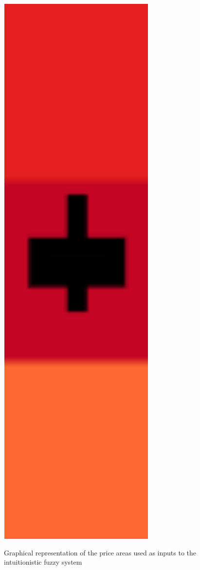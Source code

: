\begin{figure}
\caption{Graphical representation of the price areas used as inputs to the
  intuitionistic fuzzy system} \centering
\includegraphics[width=0.7\textwidth]{img/areas-for-ifis.png}
\label{figure:areas-for-ifis}
\end{figure}


